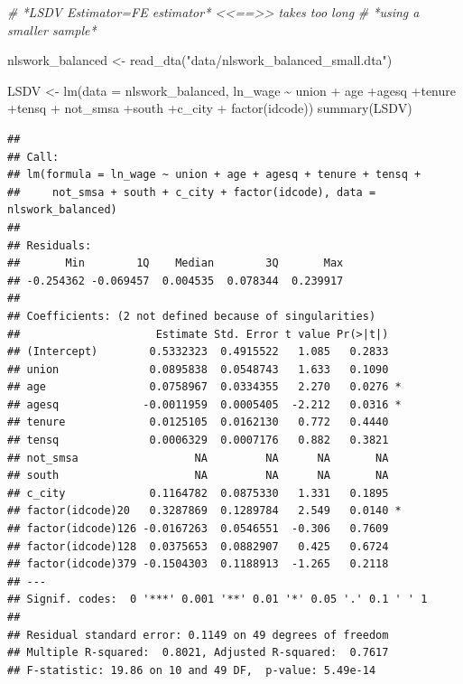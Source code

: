 \documentclass[
]{article}
\newenvironment{Shaded}{\begin{snugshade}}{\end{snugshade}}
\newcommand{\AttributeTok}[1]{\textcolor[rgb]{0.77,0.63,0.00}{#1}}
\newcommand{\CommentTok}[1]{\textcolor[rgb]{0.56,0.35,0.01}{\textit{#1}}}
\newcommand{\FunctionTok}[1]{\textcolor[rgb]{0.00,0.00,0.00}{#1}}
\newcommand{\NormalTok}[1]{#1}
\newcommand{\OtherTok}[1]{\textcolor[rgb]{0.56,0.35,0.01}{#1}}
\newcommand{\SpecialCharTok}[1]{\textcolor[rgb]{0.00,0.00,0.00}{#1}}
\newcommand{\StringTok}[1]{\textcolor[rgb]{0.31,0.60,0.02}{#1}}
\begin{document}
\begin{Shaded}
\begin{Highlighting}[]
\CommentTok{\# *LSDV Estimator=FE estimator* \textless{}\textless{}==\textgreater{}\textgreater{} takes too long}
\CommentTok{\# *using a smaller sample*}

\NormalTok{nlswork\_balanced }\OtherTok{\textless{}{-}} \FunctionTok{read\_dta}\NormalTok{(}\StringTok{"data/nlswork\_balanced\_small.dta"}\NormalTok{)}

\NormalTok{  LSDV }\OtherTok{\textless{}{-}} \FunctionTok{lm}\NormalTok{(}\AttributeTok{data =}\NormalTok{ nlswork\_balanced, ln\_wage }\SpecialCharTok{\textasciitilde{}}\NormalTok{ union }\SpecialCharTok{+}
\NormalTok{               age }\SpecialCharTok{+}\NormalTok{agesq }\SpecialCharTok{+}\NormalTok{tenure }\SpecialCharTok{+}\NormalTok{tensq }\SpecialCharTok{+}
\NormalTok{               not\_smsa }\SpecialCharTok{+}\NormalTok{south }\SpecialCharTok{+}\NormalTok{c\_city }\SpecialCharTok{+} \FunctionTok{factor}\NormalTok{(idcode))}
  \FunctionTok{summary}\NormalTok{(LSDV)}
\end{Highlighting}
\end{Shaded}

\begin{verbatim}
## 
## Call:
## lm(formula = ln_wage ~ union + age + agesq + tenure + tensq + 
##     not_smsa + south + c_city + factor(idcode), data = nlswork_balanced)
## 
## Residuals:
##       Min        1Q    Median        3Q       Max 
## -0.254362 -0.069457  0.004535  0.078344  0.239917 
## 
## Coefficients: (2 not defined because of singularities)
##                     Estimate Std. Error t value Pr(>|t|)  
## (Intercept)        0.5332323  0.4915522   1.085   0.2833  
## union              0.0895838  0.0548743   1.633   0.1090  
## age                0.0758967  0.0334355   2.270   0.0276 *
## agesq             -0.0011959  0.0005405  -2.212   0.0316 *
## tenure             0.0125105  0.0162130   0.772   0.4440  
## tensq              0.0006329  0.0007176   0.882   0.3821  
## not_smsa                  NA         NA      NA       NA  
## south                     NA         NA      NA       NA  
## c_city             0.1164782  0.0875330   1.331   0.1895  
## factor(idcode)20   0.3287869  0.1289784   2.549   0.0140 *
## factor(idcode)126 -0.0167263  0.0546551  -0.306   0.7609  
## factor(idcode)128  0.0375653  0.0882907   0.425   0.6724  
## factor(idcode)379 -0.1504303  0.1188913  -1.265   0.2118  
## ---
## Signif. codes:  0 '***' 0.001 '**' 0.01 '*' 0.05 '.' 0.1 ' ' 1
## 
## Residual standard error: 0.1149 on 49 degrees of freedom
## Multiple R-squared:  0.8021, Adjusted R-squared:  0.7617 
## F-statistic: 19.86 on 10 and 49 DF,  p-value: 5.49e-14
\end{verbatim}
\end{document}
